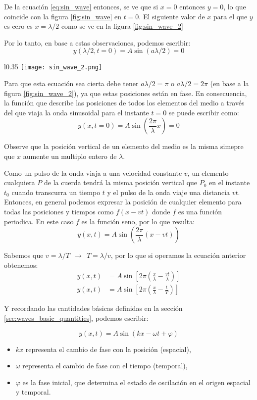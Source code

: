 De la ecuación \ref{eq:sin_wave} entonces, se ve que si \(x=0\) entonces \(y=0\), lo que coincide con la figura \ref{fig:sin_wave} en \(t=0\). El siguiente valor de \(x\) para el que \(y\) es cero es \(x=\lambda/2\) como se ve en la figura \ref{fig:sin_wave_2}

Por lo tanto, en base a estas observaciones, podemos escribir:
\[
  y(\lambda/2, t=0) = A \sin(a\lambda/2) = 0
\]
  
\begin{wrapfigure}{l}{0.35\textwidth}
  \centering
  \texttt{[image: sin\_wave\_2.png]}
  \caption{Instantánea de la cuerda en \(t=0\) donde una partícula \(P\) cualquiera tiene la misma posición vertical que \(P_0\) cuando la onda viaja una distancia \(v t\).}
  \label{fig:sin_wave_2}
\end{wrapfigure}
Para que esta ecuación sea cierta debe tener \(a\lambda/2 = \pi\) o \(a\lambda/2 = 2\pi\) (en base a la figura \ref{fig:sin_wave_2}), ya que estas posiciones están en fase. En consecuencia, la función que describe las posiciones de todos los elementos del medio a través del que viaja la onda sinusoidal para el instante \(t=0\) se puede escribir como:
\[
  y(x, t=0) = A \sin(\frac{2\pi}{\lambda} x) = 0
\]

Observe que la posición vertical de un elemento del medio es la misma simepre que \(x\) aumente un multiplo entero de \(\lambda\).

Como un pulso de la onda viaja a una velocidad constante \(v\), un elemento cualquiera \(P\) de la cuerda tendrá la misma posición vertical que \(P_0\) en el instante \(t_0\) cuando transcurra un tiempo \(t\) y el pulso de la onda viaje una distancia \(v t\). Entonces, en general podemos expresar la posición de cualquier elemento para todas las posiciones y tiempos como \(f(x - v t)\) donde \(f\) es una función periodica. En este caso \(f\) es la función seno, por lo que resulta:
\[
  y(x, t) = A \sin\left(\frac{2\pi}{\lambda} (x - v t)\right)
\]
  
Sabemos que \(v = \lambda / T ~~ \rightarrow ~~ T = \lambda/v\), por lo que si operamos la ecuación anterior obtenemos:
\begin{align*}
  y(x, t) & = A \sin\left[2\pi \left(\frac{x}{\lambda} - \frac{vt}{\lambda} \right)\right] \\
  y(x, t) & = A \sin\left[2\pi \left(\frac{x}{\lambda} - \frac{t}{T} \right)\right]
\end{align*}

Y recordando las cantidades básicas definidas en la sección \ref{sec:waves_basic_quantities}, podemos escribir:

\begin{equation}
  \boxed{y(x,t) = A \sin(kx - \omega t + \varphi)}
\end{equation}
\begin{itemize}
  \item \(kx\) representa el cambio de fase con la posición (espacial),
  \item \(\omega\) representa el cambio de fase con el tiempo (temporal),
  \item \(\varphi\) es la fase inicial, que determina el estado de oscilación en el origen espacial y temporal.
\end{itemize}
